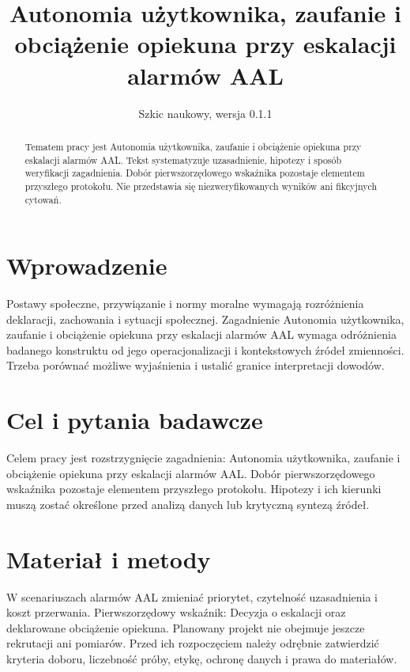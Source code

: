 \documentclass[11pt,a4paper]{article}
\title{Autonomia użytkownika, zaufanie i obciążenie opiekuna przy eskalacji alarmów AAL}
\author{}
\date{Szkic naukowy, wersja 0.1.1}
\begin{document}
\maketitle

\begin{abstract}

Tematem pracy jest Autonomia użytkownika, zaufanie i obciążenie opiekuna przy eskalacji alarmów AAL. Tekst systematyzuje uzasadnienie, hipotezy i sposób weryfikacji zagadnienia. Dobór pierwszorzędowego wskaźnika pozostaje elementem przyszłego protokołu. Nie przedstawia się niezweryfikowanych wyników ani fikcyjnych cytowań.

\end{abstract}

\section{Wprowadzenie}

Postawy społeczne, przywiązanie i normy moralne wymagają rozróżnienia deklaracji, zachowania i sytuacji społecznej. Zagadnienie Autonomia użytkownika, zaufanie i obciążenie opiekuna przy eskalacji alarmów AAL wymaga odróżnienia badanego konstruktu od jego operacjonalizacji i kontekstowych źródeł zmienności. Trzeba porównać możliwe wyjaśnienia i ustalić granice interpretacji dowodów.

\section{Cel i pytania badawcze}

Celem pracy jest rozstrzygnięcie zagadnienia: Autonomia użytkownika, zaufanie i obciążenie opiekuna przy eskalacji alarmów AAL. Dobór pierwszorzędowego wskaźnika pozostaje elementem przyszłego protokołu. Hipotezy i ich kierunki muszą zostać określone przed analizą danych lub krytyczną syntezą źródeł.

\section{Materiał i metody}

W scenariuszach alarmów AAL zmieniać priorytet, czytelność uzasadnienia i koszt przerwania. Pierwszorzędowy wskaźnik: Decyzja o eskalacji oraz deklarowane obciążenie opiekuna. Planowany projekt nie obejmuje jeszcze rekrutacji ani pomiarów. Przed ich rozpoczęciem należy odrębnie zatwierdzić kryteria doboru, liczebność próby, etykę, ochronę danych i prawa do materiałów.
\end{document}
